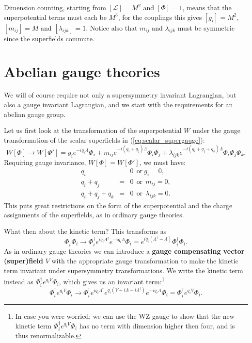 \documentclass[notes.tex]{subfiles}
\begin{document}
Dimension counting, starting from $[\mathcal{L}]=M^2$ and $[\Phi]=1$, means that the superpotential terms must each be $M^3$, for the couplings this gives $[g_i]=M^2$, $[m_{ij}]=M$ and $[\lambda_{ijk}]=1$. Notice also that $m_{ij}$ and $\lambda_{ijk}$ must be symmetric since the superfields commute.



\section[Albanian gauge theories]{Abelian gauge theories}
We will of course require not only a supersymmetry invariant Lagrangian, but also a gauge invariant Lagrangian, and we start with the requirements for an abelian gauge group. 

Let us first look at the transformation of the superpotential $W$ under the gauge transformation of the scalar superfields in (\ref{eq:scalar_supergauge}):
\[W[\Phi] \to W[\Phi'] = g_ie^{-iq_i\Lambda }\Phi_i + m_{ij}e^{-i(q_i+q_j)\Lambda}\Phi_i\Phi_j + \lambda_{ijk}e^{-i(q_i+q_j+q_k)\Lambda}\Phi_i\Phi_j\Phi_k.\]
Requiring gauge invariance, $W[\Phi] = W[\Phi']$, we must have:
\begin{eqnarray}
q_i &=& 0 ~~\text{or}~g_i = 0, \\
q_i+q_j &=& 0 ~~\text{or}~~m_{ij} = 0,  \\
q_i+q_j+q_k &=& 0  ~~\text{or}~~ \lambda_{ijk}=0.
\end{eqnarray}
This puts great restrictions on the form of the superpotential and the charge assignments of the superfields, as in ordinary gauge theories. 

What then about the kinetic term? This transforms as
\[\Phi^\dagger_i\Phi_i \to \Phi^\dagger_i e^{iq_i\Lambda^\dagger }e^{-iq_i\Lambda }\Phi_i = e^{iq_i(\Lambda^\dagger - \Lambda)}\Phi^\dagger_i\Phi_i.\]
As in  ordinary gauge theories we can introduce a {\bf gauge compensating vector (super)field} $V$ with the appropriate gauge transformation to make the kinetic term invariant under supersymmetry transformations. We write the kinetic term instead as $\Phi^\dagger_i e^{q_iV}\Phi_i$, which gives us an invariant term:\footnote{In case you were worried: we can use the WZ gauge to show that the new kinetic term $ \Phi^\dagger_ie^{q_iV}\Phi_i$ has no term with dimension higher then four, and is thus renormalizable.}
\[\Phi^\dagger_ie^{q_iV}\Phi_i \to \Phi^\dagger_i e^{iq_i\Lambda^\dagger }e^{q_i(V + i\Lambda - i\Lambda^\dagger)}e^{-iq_i\Lambda}\Phi_i = \Phi^\dagger_ie^{q_iV}\Phi_i.\]
\end{document}

